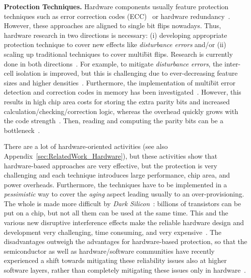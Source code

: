 \textbf{Protection Techniques.}
Hardware components usually feature protection techniques such as error correction codes (ECC)~\cite{hamming1950error,Kim:2007:MET:1331699.1331719} or hardware redundancy~\cite{ernst2004razor,su1980hardware}. However, these approaches are aligned to single bit flips nowadays. Thus, hardware research in two directions is necessary: (i) developing appropriate protection technique to cover new effects like \emph{disturbance errors} and/or (ii) scaling up traditional techniques to cover multi\=bit flips. Research is currently done in both directions~\cite{DBLP:books/daglib/0037372}. For example, to mitigate \emph{disturbance errors}, the inter-cell isolation is improved, but this is challenging due to ever-decreasing feature sizes and higher densities~\cite{DBLP:conf/isca/KimDKFLLWLM14,DBLP:conf/date/Mutlu17}. Furthermore, the implementation of multi\=bit error detection and correction codes in memory has been investigated~\cite{Kim:2007:MET:1331699.1331719}. However, this results in high chip area costs for storing the extra parity bits and increased calculation/checking/correction logic, whereas the overhead quickly grows with the code strength~\cite{Kim:2007:MET:1331699.1331719}. Then, reading and computing the parity bits can be a bottleneck~\cite{Kim:2007:MET:1331699.1331719}.

There are a lot of hardware-oriented activities (see also Appendix~\ref{sec:RelatedWork_Hardware}), but these activities show that hardware-based approaches are very effective, but the protection is very challenging and each technique introduces large performance, chip area, and power overheads. Furthermore, the techniques have to be implemented in a \emph{pessimistic} way to cover the \emph{aging} aspect leading usually to an over-provisioning. The whole is made more difficult by \emph{Dark Silicon}~\cite{DBLP:journals/micro/EsmaeilzadehBASB12}: billions of transistors can be put on a chip, but not all them can be used at the same time. This and the various new disruptive interference effects make the reliable hardware design and development very challenging, time consuming, and very expensive~\cite{DBLP:books/daglib/0037372}. The disadvantages outweigh the advantages for hardware-based protection, so that the semiconductor as well as hardware/software communities have recently experienced a shift towards mitigating these reliability issues also at higher software layers, rather than completely mitigating these issues only in hardware~\cite{DBLP:conf/dac/HenkelBDGNSTW13,DBLP:books/daglib/0037372,DBLP:journals/it/ShafiqueABCCDEH15}. 

